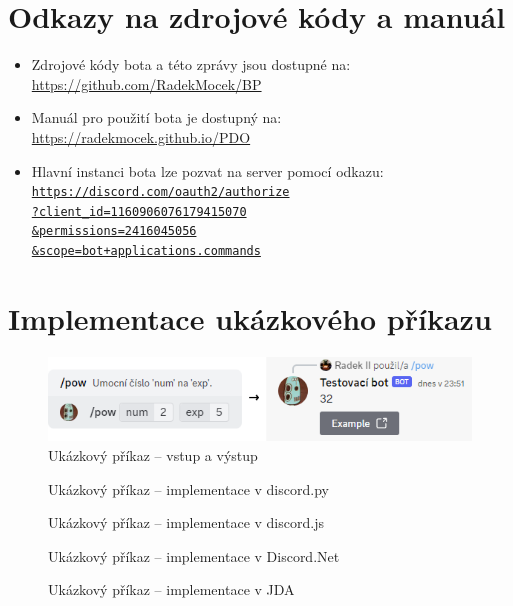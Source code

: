 \documentclass[FM]{tulthesis}
\begin{document}
	\chapter{Odkazy na zdrojové kódy a manuál}	
	\begin{itemize}
		\item Zdrojové kódy bota a této zprávy jsou dostupné na: \\\url{https://github.com/RadekMocek/BP}%
		\item Manuál pro použití bota je dostupný na: \\\url{https://radekmocek.github.io/PDO}%
		\item Hlavní instanci bota lze pozvat na server pomocí odkazu: \\ \href{https://discord.com/oauth2/authorize?client_id=1160906076179415070&permissions=2416045056&scope=bot+applications.commands}{\texttt{https://discord.com/oauth2/authorize\\?client\_id=1160906076179415070\\\&permissions=2416045056\\\&scope=bot+applications.commands}}%
	\end{itemize}
	{\let\clearpage\relax \chapter{Implementace ukázkového příkazu}\label{AppendixCodeExamples}}
	\begin{figure}[ht]
		\centering
		\includegraphics[width=\textwidth]{img/ExampleCommand}
		\caption{Ukázkový příkaz – vstup a výstup}
	\end{figure}	
	\begin{figure}[ht]
		
		\caption{Ukázkový příkaz – implementace v discord.py}
	\end{figure}	
	\begin{figure}[ht]
		
		\caption{Ukázkový příkaz – implementace v discord.js}
	\end{figure}	
	\begin{figure}[ht]
		
		\caption{Ukázkový příkaz – implementace v Discord.Net}
	\end{figure}	
	\begin{figure}[ht]
		
		\caption{Ukázkový příkaz – implementace v JDA}
	\end{figure}
\end{document}
